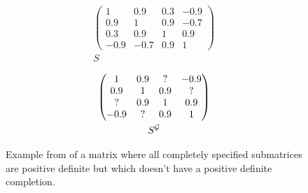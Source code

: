 \begin{figure}
    \begin{minipage}[c]{.3\linewidth}
        \centering
        \begin{gather*}
            \begin{pmatrix}
                1 & 0.9 & 0.3 & -0.9 \\
                0.9 & 1 & 0.9 & -0.7 \\
                0.3 & 0.9 & 1 & 0.9 \\
                -0.9 & -0.7 & 0.9 & 1
            \end{pmatrix}\\
            S
        \end{gather*}
    \end{minipage}
    \hfill
    \begin{minipage}[c]{.2\linewidth}
        \centering
    \end{minipage}
    \hfill
    \begin{minipage}[c]{.3\linewidth} %
        \centering
        \begin{gather*}
             \begin{pmatrix}
                1 & 0.9 & ? & -0.9 \\
                0.9 & 1 & 0.9 & ? \\
                ? & 0.9 & 1 & 0.9 \\
                -0.9 & ? & 0.9 & 1
            \end{pmatrix}\\
            S^{\mathcal{G}}
        \end{gather*}
    \end{minipage}

    \caption{Example from \cite[Section 9.3]{maathuis2018handbook} of a matrix where all completely specified submatrices are positive definite but which doesn't have a positive definite completion.}
    \label{fig-no-completion}
\end{figure}





